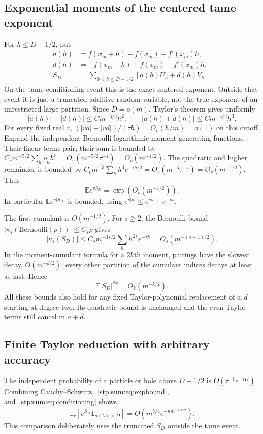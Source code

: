 \documentclass[11pt]{article}
\theoremstyle{remark}\newtheorem{remark}[theorem]{Remark}
\newcommand{\E}{\mathbb E}
\newcommand{\ind}{\mathbf 1}
\begin{document}
\subsection{Exponential moments of the centered tame exponent}
For $h\le D-1/2$, put
\begin{align*}
 a(h)&=f(x_m+h)-f(x_m)-f'(x_m)h,\\
 d(h)&=-f(x_m-h)+f(x_m)-f'(x_m)h,\\
 S_D&=\sum_{0<h\le D-1/2}[a(h)U_h+d(h)V_h].
\end{align*}
On the tame conditioning event this is the exact centered exponent. Outside that event it is just a truncated additive random variable, not the true exponent of an unrestricted large partition. Since $D=o(m)$, Taylor's theorem gives uniformly
\begin{equation}\label{stp:sum:eq:adbound}
 |a(h)|+|d(h)|\le Cm^{-3/2}h^2,
 \qquad |a(h)+d(h)|\le Cm^{-5/2}h^3.
\end{equation}
For every fixed real $v$, $(|va|+|vd|)/(\tau h)=O_v(h/m)=o(1)$ on this cutoff. Expand the independent Bernoulli logarithmic moment generating functions. Their linear terms pair; their sum is bounded by
$C_vm^{-5/2}\sum_h\rho_hh^3=O_v(m^{-5/2}\tau^{-4})=O_v(m^{-1/2})$.
The quadratic and higher remainder is bounded by
$C_vm^{-3}\sum_hh^4e^{-\tau h/2}=O_v(m^{-3}\tau^{-5})=O_v(m^{-1/2})$.
Thus
\begin{equation}\label{stp:sum:eq:expbound}
 \E e^{vS_D}=\exp(O_v(m^{-1/2})).
\end{equation}
In particular $\E e^{v|S_D|}$ is bounded, using $e^{v|s|}\le e^{vs}+e^{-vs}$.

The first cumulant is $O(m^{-1/2})$. For $s\ge2$, the Bernoulli bound $|\kappa_s(\mathrm{Bernoulli}(\rho))|\le C_s\rho$ gives
\[
 |\kappa_s(S_D)|\le C_sm^{-3s/2}\sum_h h^{2s}e^{-\tau h}
 =O_s(m^{-(s-1)/2}).
\]
In the moment-cumulant formula for a $2k$th moment, pairings have the slowest decay, $O(m^{-k/2})$; every other partition of the cumulant indices decays at least as fast. Hence
\begin{equation}\label{stp:sum:eq:S-moments}
 \E|S_D|^{2k}=O_k(m^{-k/2}).
\end{equation}
All these bounds also hold for any fixed Taylor-polynomial replacement of $a,d$ starting at degree two. Its quadratic bound is unchanged and the even Taylor terms still cancel in $a+d$.

\subsection{Finite Taylor reduction with arbitrary accuracy}
The independent probability of a particle or hole above $D-1/2$ is $O(\tau^{-1}e^{-\tau D})$. Combining Cauchy--Schwarz,~\eqref{stp:sum:eq:expbound}, and~\eqref{stp:sum:eq:conditioning} shows
\begin{equation}\label{stp:sum:eq:cutofftail}
 \E_r[e^{S_D}\ind_{d(\lambda)>D}]
 =O(m^{5/4}e^{-\kappa m^{\delta-1/2}}).
\end{equation}
This comparison deliberately uses the truncated $S_D$ outside the tame event.
\end{document}
